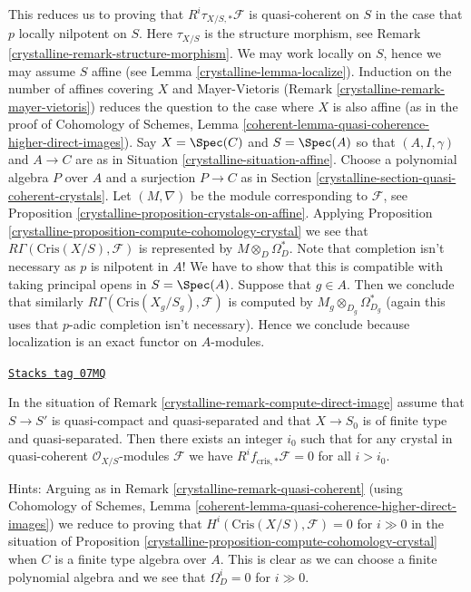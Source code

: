 \begin{remark}
\medskip\noindent
This reduces us to proving that $R^i\tau_{X/S, *}\mathcal{F}$
is quasi-coherent on $S$ in the case that $p$ locally nilpotent on $S$. Here
$\tau_{X/S}$ is the structure morphism, see
Remark \ref{crystalline-remark-structure-morphism}.
We may work locally on $S$, hence we may assume $S$ affine
(see Lemma \ref{crystalline-lemma-localize}). Induction on the number
of affines covering $X$ and Mayer-Vietoris
(Remark \ref{crystalline-remark-mayer-vietoris}) reduces the question to
the case where $X$ is also affine (as in the proof of
Cohomology of Schemes, Lemma
\ref{coherent-lemma-quasi-coherence-higher-direct-images}).
Say $X = \Spec(C)$ and $S = \Spec(A)$ so that $(A, I, \gamma)$ and
$A \to C$ are as
in Situation \ref{crystalline-situation-affine}. Choose a polynomial algebra
$P$ over $A$ and a surjection $P \to C$ as in
Section \ref{crystalline-section-quasi-coherent-crystals}.
Let $(M, \nabla)$ be the module corresponding to $\mathcal{F}$, see
Proposition \ref{crystalline-proposition-crystals-on-affine}.
Applying
Proposition \ref{crystalline-proposition-compute-cohomology-crystal}
we see that $R\Gamma(\text{Cris}(X/S), \mathcal{F})$ is represented by
$M \otimes_D \Omega_D^*$. Note that completion isn't necessary
as $p$ is nilpotent in $A$! We have to show that this is compatible
with taking principal opens in $S = \Spec(A)$. Suppose that $g \in A$.
Then we conclude that similarly $R\Gamma(\text{Cris}(X_g/S_g), \mathcal{F})$
is computed by $M_g \otimes_{D_g} \Omega_{D_g}^*$ (again this uses that
$p$-adic completion isn't necessary). Hence we conclude because localization
is an exact functor on $A$-modules.
\end{remark}

\begin{remark}[Boundedness]

\label{crystalline-remark-bounded-cohomology}
\href{https://stacks.math.columbia.edu/tag/07MQ}{\texttt{Stacks tag 07MQ}}

In the situation of Remark \ref{crystalline-remark-compute-direct-image}
assume that $S \to S'$ is quasi-compact and quasi-separated and
that $X \to S_0$ is of finite type and quasi-separated. Then there exists
an integer $i_0$ such that for any crystal
in quasi-coherent $\mathcal{O}_{X/S}$-modules $\mathcal{F}$
we have $R^if_{\text{cris}, *}\mathcal{F} = 0$ for all $i > i_0$.

\medskip\noindent
Hints: Arguing as in Remark \ref{crystalline-remark-quasi-coherent} (using
Cohomology of Schemes, Lemma
\ref{coherent-lemma-quasi-coherence-higher-direct-images})
we reduce to proving that $H^i(\text{Cris}(X/S), \mathcal{F}) = 0$ for $i \gg 0$
in the situation of Proposition \ref{crystalline-proposition-compute-cohomology-crystal}
when $C$ is a finite type algebra over $A$. This is clear as we can
choose a finite polynomial algebra and we see that $\Omega^i_D = 0$
for $i \gg 0$.
\end{remark}

